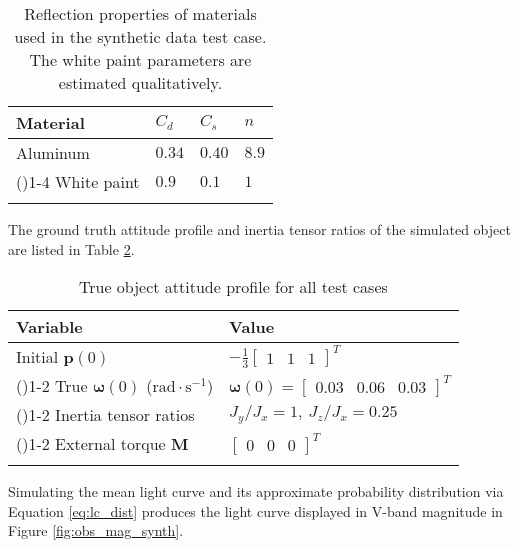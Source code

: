 \documentclass[a4paper,twocolumn]{spaceDebrisC} %
\newcommand{\grule}[0]{\arrayrulecolor{darkgray}\cmidrule(){1-2}}
\newcommand{\brule}[0]{\arrayrulecolor{black} \bottomrule}
\newcommand{\vctr}[1]{\bm{#1}}
\begin{document}
\begin{table}[H]
  \centering
  \renewcommand{\arraystretch}{1.2} 
  \caption{Reflection properties of materials used in the synthetic data test case. The white paint parameters are estimated qualitatively.}
  \vspace*{6pt}
  \begin{tabular}{@{} l l l l @{}}
    \toprule
 Material & $C_d$ & $C_s$ & $n$ \\ \midrule
 Aluminum \cite{fankhauser2023} & $0.34$ & $0.40$ & $8.9$ \\ \arrayrulecolor{darkgray}\cmidrule(){1-4}
 White paint & $0.9$ & $0.1$ & $1$ \\ \brule
  \end{tabular}
  \label{tb:synth_matprops}
\end{table}

The ground truth attitude profile and inertia tensor ratios of the simulated object are listed in Table \ref{tb:synth_att}.

\begin{table}[H]
  \centering
  \renewcommand{\arraystretch}{1.2} 
  \caption{True object attitude profile for all test cases}
  \vspace*{6pt}
  \begin{tabular}{@{} l l @{}}
    \toprule
 Variable & Value \\ \midrule
 Initial $\vctr{p}(0)$ & $-\frac{1}{3} \begin{bmatrix} 1 & 1 & 1 \end{bmatrix}^T$ \\ \grule
 True $\vctr{\omega}(0)$ ($\text{rad}\cdot\text{s}^{-1}$) & $\vctr{\omega}(0) = \begin{bmatrix} 0.03 & 0.06 & 0.03 \end{bmatrix}^T$ \\ \grule
 Inertia tensor ratios & $J_y / J_x = 1, \: J_z / J_x = 0.25$ \\ \grule
 External torque $\vctr{M}$ & $\begin{bmatrix} 0 & 0 & 0 \end{bmatrix}^T$ \\ \brule
  \end{tabular}
  \label{tb:synth_att}
\end{table}
\FloatBarrier


Simulating the mean light curve and its approximate probability distribution via Equation \ref{eq:lc_dist} produces the light curve displayed in V-band magnitude in Figure \ref{fig:obs_mag_synth}.
\end{document}
